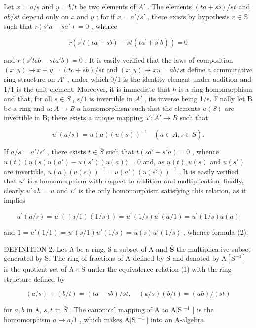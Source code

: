 Let \(x = a / s\) and \(y = b / t\) be two elements of \(A'\) . The elements \((ta + sb) / st\) and \(ab / st\) depend only on \(x\) and \(y\) ; for if \(x = a' / s'\) , there exists by hypothesis \(r \in \overline{\mathbb{S}}\) such that \(r(s'a - sa') = 0\) , whence

\[
r \left(s ^ {\prime} t (t a + s b) - s t \left(t a ^ {\prime} + s ^ {\prime} b\right)\right) = 0
\]

and \(r(s'tab - sta'b) = 0\) . It is easily verified that the laws of composition \((x,y) \mapsto x + y = (ta + sb)/st\) and \((x,y) \mapsto xy = ab/st\) define a commutative ring structure on \(A'\) , under which 0/1 is the identity element under addition and 1/1 is the unit element. Moreover, it is immediate that \(h\) is a ring homomorphism and that, for all \(s \in S\) , \(s/1\) is invertible in \(A'\) , its inverse being 1/s. Finally let B be a ring and \(u: A \to B\) a homomorphism such that the elements \(u(S)\) are invertible in B; there exists a unique mapping \(u': A' \to B\) such that

\[
u ^ {\prime} (a / s) = u (a) (u (s)) ^ {- 1} \quad (a \in A, s \in \bar {S}).\tag{2}
\]

If \(a / s = a' / s'\) , there exists \(t \in \overline{S}\) such that \(t(sa' - s'a) = 0\) , whence \(u(t)(u(s)u(a') - u(s'))u(a)) = 0\) and, as \(u(t), u(s)\) and \(u(s')\) are invertible, \(u(a)(u(s))^{-1} = u(a')(u(s'))^{-1}\) . It is easily verified that \(u'\) is a homomorphism with respect to addition and multiplication; finally, clearly \(u' \circ h = u\) and \(u'\) is the only homomorphism satisfying this relation, as it implies

\[
u ^ {\prime} (a / s) = u ^ {\prime} ((a / 1) (1 / s)) = u ^ {\prime} (1 / s) u ^ {\prime} (a / 1) = u ^ {\prime} (1 / s) u (a)
\]

and \(1 = u'(1/1) = u'(s/1)u'(1/s) = u(s)u'(1/s)\) , whence formula (2).

DEFINITION 2. Let A be a ring, S a subset of A and \(\overline{\mathbf{S}}\) the multiplicative subset generated by S. The ring of fractions of A defined by S and denoted by \(\mathrm{A}[\mathrm{S}^{-1}]\) is the quotient set of \(\mathrm{A} \times \overline{\mathrm{S}}\) under the equivalence relation (1) with the ring structure defined by

\[
(a / s) + (b / t) = (t a + s b) / s t, \quad (a / s) (b / t) = (a b) / (s t)
\]

for \(a, b\) in A, \(s, t\) in \(\bar{S}\) . The canonical mapping of A to A{[}S \(^{-1}\) {]} is the homomorphism \(a \mapsto a/1\) , which makes A{[}S \(^{-1}\) {]} into an A-algebra.

